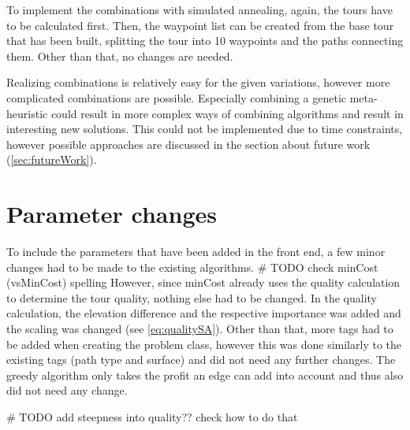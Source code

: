 To implement the combinations with simulated annealing, again, the tours have to be calculated first.
Then, the waypoint list can be created from the base tour that has been built, splitting the tour into 10 waypoints and the paths connecting them. 
Other than that, no changes are needed.

Realizing combinations is relatively easy for the given variations, however more complicated combinations are possible.
Especially combining a genetic meta-heuristic could result in more complex ways of combining algorithms and result in interesting new solutions. 
This could not be implemented due to time constraints, however possible approaches are discussed in the section about future work (\ref{sec:futureWork}).


\section{Parameter changes}
\label{sec:parameterChanges}

To include the parameters that have been added in the front end, a few minor changes had to be made to the existing algorithms. \# TODO check minCost (vsMinCost) spelling
However, since minCost already uses the quality calculation to determine the tour quality, nothing else had to be changed.
In the quality calculation, the elevation difference and the respective importance was added and the scaling was changed (see \ref{eq:qualitySA}).
Other than that, more tags had to be added when creating the problem class, however this was done similarly to the existing tags (path type and surface) and did not need any further changes.
The greedy algorithm only takes the profit an edge can add into account and thus also did not need any change.

\# TODO add steepness into quality?? check how to do that